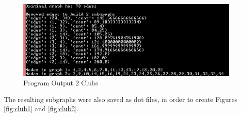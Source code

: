 \documentclass[paper=a4, fontsize=11pt]{scrartcl} %
\numberwithin{equation}{section} %
\numberwithin{figure}{section} %
\numberwithin{table}{section} %
\begin{document}
\begin{figure}[H]
\includegraphics[width=1\textwidth]{weighted/output}
\caption{Program Output 2 Clubs}
\label{fig:output}
\end{figure}

The resulting subgraphs were also saved as dot files, in order to create Figures \ref{fig:club1} and \ref{fig:club2}.
\end{document}

